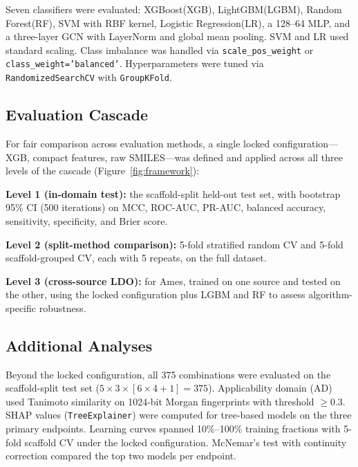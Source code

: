 Seven classifiers were evaluated: XGBoost(XGB),\cite{Chen_XGBoost_2016} LightGBM(LGBM),\cite{Ke_LightGBM_2017} Random Forest(RF),\cite{Breiman_2001} SVM with RBF kernel,\cite{Cortes_Vapnik_1995}
Logistic Regression(LR),\cite{Cox_1958} a 128--64 MLP,\cite{Rumelhart_1986} and a three-layer GCN\cite{Kipf_Welling_2017} with LayerNorm and global mean pooling. SVM and LR used standard scaling.
Class imbalance was handled via \texttt{scale\_pos\_weight} or \texttt{class\_weight='balanced'}. Hyperparameters were tuned via \texttt{RandomizedSearchCV} with \texttt{GroupKFold}.\cite{Pedregosa_sklearn_2011}

\subsection{Evaluation Cascade}

For fair comparison across evaluation methods, a single locked configuration---XGB, compact features, raw SMILES---was defined and applied across all three levels of the cascade (Figure~\ref{fig:framework}):

\textbf{Level 1 (in-domain test):} the scaffold-split held-out test set, with bootstrap 95\% CI (500 iterations) on MCC,\cite{Matthews_1975} ROC-AUC, PR-AUC, balanced accuracy, sensitivity, specificity, and Brier score.\cite{Brier_1950}

\textbf{Level 2 (split-method comparison):} 5-fold stratified random CV and 5-fold scaffold-grouped CV, each with 5 repeats, on the full dataset.

\textbf{Level 3 (cross-source LDO):} for Ames, trained on one source and tested on the other, using the locked configuration plus LGBM and RF to assess algorithm-specific robustness.

\subsection{Additional Analyses}

Beyond the locked configuration, all 375 combinations were evaluated on the scaffold-split test set ($5 \times 3 \times [6 \times 4 + 1] = 375$). Applicability domain (AD) used 
Tanimoto similarity on 1024-bit Morgan fingerprints\cite{Rogers_Hahn_2010} with threshold $\geq 0.3$. SHAP values\cite{Lundberg_SHAP_2017} (\texttt{TreeExplainer})
were computed for tree-based models on the three primary endpoints. Learning curves spanned 10\%--100\% training fractions with 5-fold scaffold CV under the locked configuration.
McNemar's test\cite{McNemar_1947} with continuity correction compared the top two models per endpoint.

